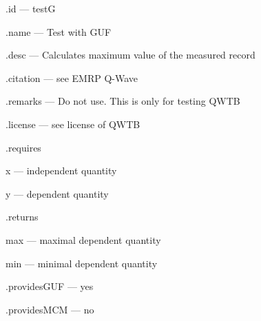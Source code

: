 \begin{tightdesc}
\item [\textsf{.id}] --- testG
\item [\textsf{.name}] --- Test with GUF
\item [\textsf{.desc}] --- Calculates maximum value of the measured record
\item [\textsf{.citation}] --- see EMRP Q-Wave
\item [\textsf{.remarks}] --- Do not use. This is only for testing QWTB
\item [\textsf{.license}] --- see license of QWTB
\item [\textsf{.requires}] \rule{0em}{0em}
\begin{tightdesc}
\item [\textsf{x}] --- independent quantity
\item [\textsf{y}] --- dependent quantity
\end{tightdesc}
\item [\textsf{.returns}] \rule{0em}{0em}
\begin{tightdesc}
\item [\textsf{max}] --- maximal dependent quantity
\item [\textsf{min}] --- minimal dependent quantity
\end{tightdesc}
\item [\textsf{.providesGUF}] --- yes
\item [\textsf{.providesMCM}] ---  no
\end{tightdesc}
